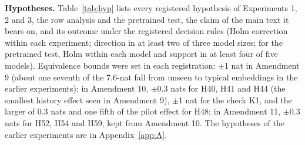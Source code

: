 \textbf{Hypotheses.} Table~\ref{tab:hyp} lists every registered hypothesis of Experiments 1, 2 and 3, the row analysis and the pretrained test, the claim of the main text it bears on, and its outcome under the registered decision rules (Holm correction within each experiment; direction in at least two of three model sizes; for the pretrained test, Holm within each model and support in at least four of five models). Equivalence bounds were set in each registration: $\pm$1 nat in Amendment 9 (about one seventh of the 7.6-nat fall from unseen to typical embeddings in the earlier experiments); in Amendment 10, $\pm$0.3 nats for H40, H41 and H44 (the smallest history effect seen in Amendment 9), $\pm$1 nat for the check K1, and the larger of 0.3 nats and one fifth of the pilot effect for H48; in Amendment 11, $\pm$0.3 nats for H52, H54 and H59, kept from Amendment 10. The hypotheses of the earlier experiments are in Appendix~\ref{app:A}.

